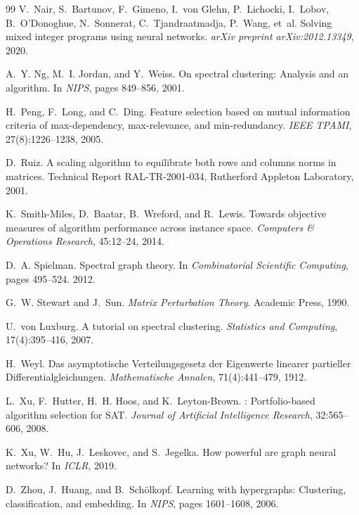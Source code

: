\documentclass[12pt]{article}
\begin{document}
\begin{thebibliography}{99}
V.~Nair, S.~Bartunov, F.~Gimeno, I.~von Glehn, P.~Lichocki, I.~Lobov,
  B.~O'Donoghue, N.~Sonnerat, C.~Tjandraatmadja, P.~Wang, et~al.
\newblock Solving mixed integer programs using neural networks.
\newblock \emph{arXiv preprint arXiv:2012.13349}, 2020.

A.~Y. Ng, M.~I. Jordan, and Y.~Weiss.
\newblock On spectral clustering: Analysis and an algorithm.
\newblock In \emph{NIPS}, pages 849--856, 2001.

H.~Peng, F.~Long, and C.~Ding.
\newblock Feature selection based on mutual information criteria of
  max-dependency, max-relevance, and min-redundancy.
\newblock \emph{IEEE TPAMI}, 27(8):1226--1238, 2005.

D.~Ruiz.
\newblock A scaling algorithm to equilibrate both rows and columns norms in
  matrices.
\newblock Technical Report RAL-TR-2001-034, Rutherford Appleton Laboratory, 2001.

K.~Smith-Miles, D.~Baatar, B.~Wreford, and R.~Lewis.
\newblock Towards objective measures of algorithm performance across instance
  space.
\newblock \emph{Computers \& Operations Research}, 45:12--24, 2014.

D.~A. Spielman.
\newblock Spectral graph theory.
\newblock In \emph{Combinatorial Scientific Computing}, pages 495--524. 2012.

G.~W. Stewart and J.~Sun.
\newblock \emph{Matrix Perturbation Theory}.
\newblock Academic Press, 1990.

U.~von Luxburg.
\newblock A tutorial on spectral clustering.
\newblock \emph{Statistics and Computing}, 17(4):395--416, 2007.

H.~Weyl.
\newblock Das asymptotische {Verteilungsgesetz} der {Eigenwerte} linearer
  partieller {Differentialgleichungen}.
\newblock \emph{Mathematische Annalen}, 71(4):441--479, 1912.

L.~Xu, F.~Hutter, H.~H. Hoos, and K.~Leyton-Brown.
: Portfolio-based algorithm selection for {SAT}.
\newblock \emph{Journal of Artificial Intelligence Research}, 32:565--606, 2008.

K.~Xu, W.~Hu, J.~Leskovec, and S.~Jegelka.
\newblock How powerful are graph neural networks?
\newblock In \emph{ICLR}, 2019.

D.~Zhou, J.~Huang, and B.~Sch\"olkopf.
\newblock Learning with hypergraphs: Clustering, classification, and embedding.
\newblock In \emph{NIPS}, pages 1601--1608, 2006.

\end{thebibliography}
\end{document}
